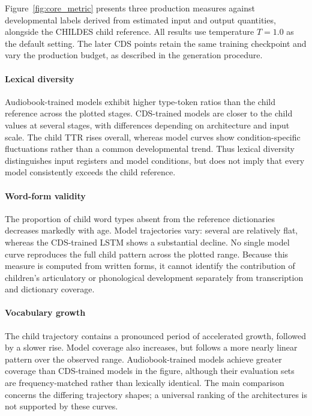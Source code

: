 Figure~\ref{fig:core_metric} presents three production measures against developmental labels derived from estimated input and output quantities, alongside the CHILDES child reference. All results use temperature $T=1.0$ as the default setting. The later CDS points retain the same training checkpoint and vary the production budget, as described in the generation procedure.

\paragraph{Lexical diversity} Audiobook-trained models exhibit higher type-token ratios than the child reference across the plotted stages. CDS-trained models are closer to the child values at several stages, with differences depending on architecture and input scale. The child TTR rises overall, whereas model curves show condition-specific fluctuations rather than a common developmental trend. Thus lexical diversity distinguishes input registers and model conditions, but does not imply that every model consistently exceeds the child reference.


\paragraph{Word-form validity} The proportion of child word types absent from the reference dictionaries decreases markedly with age. Model trajectories vary: several are relatively flat, whereas the CDS-trained LSTM shows a substantial decline. No single model curve reproduces the full child pattern across the plotted range. Because this measure is computed from written forms, it cannot identify the contribution of children's articulatory or phonological development separately from transcription and dictionary coverage.



\paragraph{Vocabulary growth} The child \meCDI{} trajectory contains a pronounced period of accelerated growth, followed by a slower rise. Model coverage also increases, but follows a more nearly linear pattern over the observed range. Audiobook-trained models achieve greater coverage than CDS-trained models in the figure, although their evaluation sets are frequency-matched rather than lexically identical. The main comparison concerns the differing trajectory shapes; a universal ranking of the architectures is not supported by these curves.

